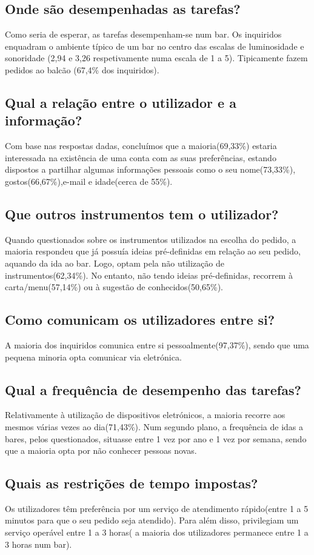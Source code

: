 \documentclass{article}
\begin{document}
\subsection*{Onde são desempenhadas as tarefas?}
Como seria de esperar, as tarefas desempenham-se num bar. Os inquiridos enquadram o ambiente típico de um bar no centro das escalas de luminosidade e sonoridade (2,94 e 3,26 respetivamente numa escala de 1 a 5). Tipicamente fazem pedidos ao balcão (67,4\% dos inquiridos).
\subsection*{Qual a relação entre o utilizador e a informação?}
Com base nas respostas dadas, concluímos que a maioria(69,33\%) estaria interessada na existência de uma conta com as suas preferências, estando dispostos a partilhar algumas informações pessoais como o seu nome(73,33\%), gostos(66,67\%),e-mail e idade(cerca de 55\%).
\subsection*{Que outros instrumentos tem o utilizador?}
Quando questionados sobre os instrumentos utilizados na escolha do pedido, a maioria respondeu que já possuía ideias pré-definidas em relação ao seu pedido, aquando da ida ao bar. Logo, optam pela não utilização de instrumentos(62,34\%). No entanto, não tendo ideias pré-definidas, recorrem à carta/menu(57,14\%) ou à sugestão de conhecidos(50,65\%).
\subsection*{Como comunicam os utilizadores entre si?}
A maioria dos inquiridos comunica entre si pessoalmente(97,37\%), sendo que uma pequena minoria opta comunicar via eletrónica.
\subsection*{Qual a frequência de desempenho das tarefas?}
Relativamente à utilização de dispositivos eletrónicos, a maioria recorre aos mesmos várias vezes ao dia(71,43\%).
Num segundo plano, a frequência de idas a bares, pelos questionados, situasse entre 1 vez por ano e 1 vez por semana, sendo que a maioria opta por não conhecer pessoas novas.
\subsection*{Quais as restrições de tempo impostas?}
Os utilizadores têm preferência por um serviço de atendimento rápido(entre 1 a 5 minutos para que o seu pedido seja atendido). Para além disso, privilegiam um serviço operável entre 1 a 3 horas( a maioria dos utilizadores permanece entre 1 a 3 horas num bar).
\end{document}
